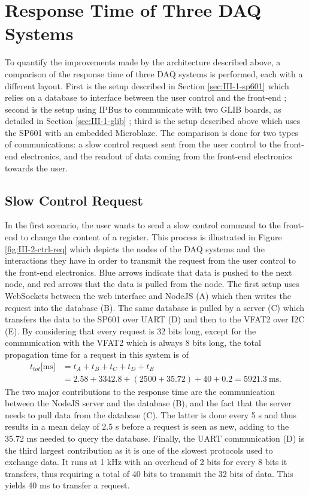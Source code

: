  \section{Response Time of Three DAQ Systems}

    To quantify the improvements made by the architecture described above, a comparison of the response time of three DAQ systems is performed, each with a different layout. First is the setup described in Section \ref{sec:III-1-sp601} which relies on a database to interface between the user control and the front-end ; second is the setup using IPBus to communicate with two GLIB boards, as detailed in Section \ref{sec:III-1-glib} ; third is the setup described above which uses the SP601 with an embedded Microblaze. The comparison is done for two types of communications: a slow control request sent from the user control to the front-end electronics, and the readout of data coming from the front-end electronics towards the user.

    \subsection{Slow Control Request}

      In the first scenario, the user wants to send a slow control command to the front-end to change the content of a register. This process is illustrated in Figure \ref{fig:III-2-ctrl-req} which depicts the nodes of the DAQ systems and the interactions they have in order to transmit the request from the user control to the front-end electronics. Blue arrows indicate that data is pushed to the next node, and red arrows that the data is pulled from the node. The first setup uses WebSockets between the web interface and NodeJS (A) which then writes the request into the database (B). The same database is pulled by a server (C) which transfers the data to the SP601 over UART (D) and then to the VFAT2 over I2C (E). By considering that every request is 32 bits long, except for the communication with the VFAT2 which is always 8 bits long, the total propagation time for a request in this system is of
      \begin{equation}
        \begin{split}
          t_{tot}\text{[ms]} & = t_A + t_B + t_C + t_D + t_E \\
                             & = 2.58 + 3342.8 + (2500 + 35.72) + 40 + 0.2 = 5921.3 \ \text{ms}.
        \end{split}
      \end{equation}
      The two major contributions to the response time are the communication between the NodeJS server and the database (B), and the fact that the server needs to pull data from the database (C). The latter is done every 5 s and thus results in a mean delay of 2.5 s before a request is seen as new, adding to the 35.72 ms needed to query the database. Finally, the UART communication (D) is the third largest contribution as it is one of the slowest protocols used to exchange data. It runs at 1 kHz with an overhead of 2 bits for every 8 bits it transfers, thus requiring a total of 40 bits to transmit the 32 bits of data. This yields 40 ms to transfer a request. \\

